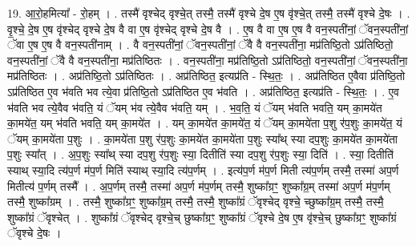 \documentclass[17pt]{extarticle}
\begin{document}
19. आ॒रो॒हमित्या᳚ - रो॒हम् । . तस्मै॑ वृश्चेद् वृश्चे॒त् तस्मै॒ तस्मै॑ वृश्चे दे॒ष ए॒ष वृ॑श्चे॒त् तस्मै॒ तस्मै॑ वृश्चे दे॒षः । . वृ॒श्चे॒ दे॒ष ए॒ष वृ॑श्चेद् वृश्चे दे॒ष वै वा ए॒ष वृ॑श्चेद् वृश्चे दे॒ष वै । . ए॒ष वै वा ए॒ष ए॒ष वै वन॒स्पती॑नां॒ ॅवन॒स्पती॑नां॒ ॅवा ए॒ष ए॒ष वै वन॒स्पती॑नाम् । . वै वन॒स्पती॑नां॒ ॅवन॒स्पती॑नां॒ ॅवै वै वन॒स्पती॑ना॒ मप्र॑तिष्ठि॒तो ऽप्र॑तिष्ठितो॒ वन॒स्पती॑नां॒ ॅवै वै वन॒स्पती॑ना॒ मप्र॑तिष्ठितः । . वन॒स्पती॑ना॒ मप्र॑तिष्ठि॒तो ऽप्र॑तिष्ठितो॒ वन॒स्पती॑नां॒ ॅवन॒स्पती॑ना॒ मप्र॑तिष्ठितः । . अप्र॑तिष्ठि॒तो ऽप्र॑तिष्ठितः । . अप्र॑तिष्ठित॒ इत्यप्र॑ति - स्थि॒तः॒ । . अप्र॑तिष्ठित ए॒वैवा प्र॑तिष्ठि॒तो ऽप्र॑तिष्ठित ए॒व भ॑वति भव त्ये॒वा प्र॑तिष्ठि॒तो ऽप्र॑तिष्ठित ए॒व भ॑वति । . अप्र॑तिष्ठित॒ इत्यप्र॑ति - स्थि॒तः॒ । . ए॒व भ॑वति भव त्ये॒वैव भ॑वति॒ यं ॅयम् भ॑व त्ये॒वैव भ॑वति॒ यम् । . भ॒व॒ति॒ यं ॅयम् भ॑वति भवति॒ यम् का॒मये॑त का॒मये॑त॒ यम् भ॑वति भवति॒ यम् का॒मये॑त । . यम् का॒मये॑त का॒मये॑त॒ यं ॅयम् का॒मये॑ता प॒शु र॑प॒शुः का॒मये॑त॒ यं ॅयम् का॒मये॑ता प॒शुः । . का॒मये॑ता प॒शु र॑प॒शुः का॒मये॑त का॒मये॑ता प॒शुः स्या᳚थ् स्या दप॒शुः का॒मये॑त का॒मये॑ता प॒शुः स्या᳚त् । . अ॒प॒शुः स्या᳚थ् स्या दप॒शु र॑प॒शुः स्या॒ दितीति॑ स्या दप॒शु र॑प॒शुः स्या॒ दिति॑ । . स्या॒ दितीति॑ स्याथ् स्या॒दि त्य॑प॒र्ण म॑प॒र्ण मिति॑ स्याथ् स्या॒दि त्य॑प॒र्णम् । . इत्य॑प॒र्ण म॑प॒र्ण मिती त्य॑प॒र्णम् तस्मै॒ तस्मा॑ अप॒र्ण मितीत्य॑ प॒र्णम् तस्मै᳚ । . अ॒प॒र्णम् तस्मै॒ तस्मा॑ अप॒र्ण म॑प॒र्णम् तस्मै॒ शुष्का᳚ग्रꣳ॒॒ शुष्का᳚ग्र॒म् तस्मा॑ अप॒र्ण म॑प॒र्णम् तस्मै॒ शुष्का᳚ग्रम् । . तस्मै॒ शुष्का᳚ग्रꣳ॒॒ शुष्का᳚ग्र॒म् तस्मै॒ तस्मै॒ शुष्का᳚ग्रं ॅवृश्चेद् वृश्चे॒ च्छुष्का᳚ग्र॒म् तस्मै॒ तस्मै॒ शुष्का᳚ग्रं ॅवृश्चेत् । . शुष्का᳚ग्रं ॅवृश्चेद् वृश्चे॒च् छुष्का᳚ग्रꣳ॒॒ शुष्का᳚ग्रं ॅवृश्चे दे॒ष ए॒ष वृ॑श्चे॒च् छुष्का᳚ग्रꣳ॒॒ शुष्का᳚ग्रं ॅवृश्चे दे॒षः । \newline
\end{document}
